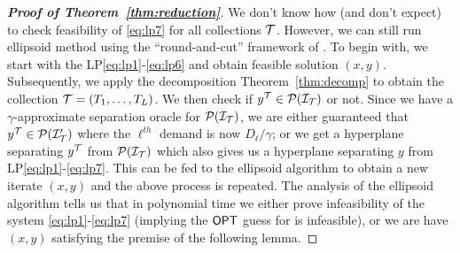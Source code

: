\begin{proof}[{\bf Proof of Theorem~\ref{thm:reduction}}]
\noindent
We don't know how (and don't expect) to check feasibility of  \eqref{eq:lp7} for all collections ${\cal T}$. However, we can still run ellipsoid method using the ``round-and-cut'' framework of \cite{CarrFLP00, AnSS14, Li15}.
To begin with, we start with the LP\eqref{eq:lp1}-\eqref{eq:lp6} and obtain feasible solution $(x,y)$. Subsequently, we apply the decomposition Theorem~\ref{thm:decomp} to obtain the collection ${\cal T} = (T_1,\ldots,T_L)$.
We then check if $y^{\cal T} \in {\cal P}({\cal I}_{\cal T})$ or not. Since we have a $\gamma$-approximate separation oracle for ${\cal P}({\cal I}_{\cal T})$, we  are either guaranteed that $y^{\cal T} \in {\cal P}({\cal I}'_{\cal T})$ where the $\ell^{th}$ demand is now  $D_\ell/\gamma$; or we get a hyperplane separating $y^{\cal T}$ from ${\cal P}({\cal I}_{\cal T})$ which also gives us a
hyperplane separating $y$ from  LP\eqref{eq:lp1}-\eqref{eq:lp7}. This can be fed to the ellipsoid algorithm to obtain a new iterate $(x,y)$ and the above process is repeated. The analysis of the ellipsoid algorithm
tells us that in polynomial time we either prove infeasibility of the system \eqref{eq:lp1}-\eqref{eq:lp7} (implying the $\mathsf{OPT}$  guess for \mckc is infeasible), or we 
are have $(x,y)$ satisfying the premise of the following lemma. 


\end{proof}
